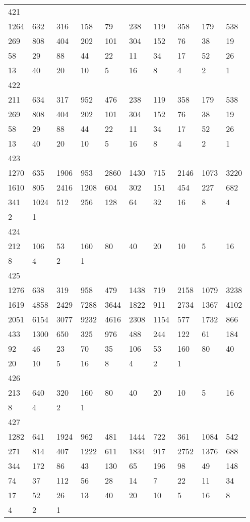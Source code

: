 \begin{longtable}{*{10}{l}}
421&&&&&&&&&\\
1264& 632& 316& 158& 79& 238& 119& 358& 179& 538\\
269& 808& 404& 202& 101& 304& 152& 76& 38& 19\\
58& 29& 88& 44& 22& 11& 34& 17& 52& 26\\
13& 40& 20& 10& 5& 16& 8& 4& 2& 1\\

422&&&&&&&&&\\
211& 634& 317& 952& 476& 238& 119& 358& 179& 538\\
269& 808& 404& 202& 101& 304& 152& 76& 38& 19\\
58& 29& 88& 44& 22& 11& 34& 17& 52& 26\\
13& 40& 20& 10& 5& 16& 8& 4& 2& 1\\

423&&&&&&&&&\\
1270& 635& 1906& 953& 2860& 1430& 715& 2146& 1073& 3220\\
1610& 805& 2416& 1208& 604& 302& 151& 454& 227& 682\\
341& 1024& 512& 256& 128& 64& 32& 16& 8& 4\\
2& 1& \\

424&&&&&&&&&\\
212& 106& 53& 160& 80& 40& 20& 10& 5& 16\\
8& 4& 2& 1& \\

425&&&&&&&&&\\
1276& 638& 319& 958& 479& 1438& 719& 2158& 1079& 3238\\
1619& 4858& 2429& 7288& 3644& 1822& 911& 2734& 1367& 4102\\
2051& 6154& 3077& 9232& 4616& 2308& 1154& 577& 1732& 866\\
433& 1300& 650& 325& 976& 488& 244& 122& 61& 184\\
92& 46& 23& 70& 35& 106& 53& 160& 80& 40\\
20& 10& 5& 16& 8& 4& 2& 1& \\

426&&&&&&&&&\\
213& 640& 320& 160& 80& 40& 20& 10& 5& 16\\
8& 4& 2& 1& \\

427&&&&&&&&&\\
1282& 641& 1924& 962& 481& 1444& 722& 361& 1084& 542\\
271& 814& 407& 1222& 611& 1834& 917& 2752& 1376& 688\\
344& 172& 86& 43& 130& 65& 196& 98& 49& 148\\
74& 37& 112& 56& 28& 14& 7& 22& 11& 34\\
17& 52& 26& 13& 40& 20& 10& 5& 16& 8\\
4& 2& 1& \\


\end{longtable}
